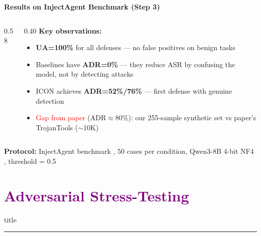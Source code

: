 \documentclass[aspectratio=169]{beamer}
\begin{document}
\begin{frame}{\textcolor{cmindsblue}{\textbf{Results on InjectAgent Benchmark (Step 3)}}}
  \vspace{-0.5cm}

  \begin{columns}[T]
    \begin{column}{0.58\textwidth}
      
    \end{column}

    \begin{column}{0.40\textwidth}
      \textcolor{cmindsblue}{\textbf{Key observations:}}\\[4pt]
      {\small
      \begin{itemize}
        \item \textbf{UA=100\%} for all defenses — no false positives on benign tasks
        \item Baselines have \textbf{ADR=0\%} — they reduce ASR by confusing the model, not by detecting attacks
        \item ICON achieves \textbf{ADR=52\%/76\%} — first defense with genuine detection
        \item \textcolor{red}{Gap from paper} (ADR$\approx$80\%): our 255-sample synthetic set vs paper's TrojanTools ($\sim$10K)
      \end{itemize}
      }
    \end{column}
  \end{columns}

  \vspace{2mm}
  {\scriptsize \textbf{Protocol:} InjectAgent benchmark \cite{zhan2024injectagent}, 50 cases per condition,
  Qwen3-8B 4-bit NF4 \cite{yang2025qwen3}, threshold = 0.5}
\end{frame}


\section{\textbf{\textcolor{purple}{Adversarial Stress-Testing}}}
\begin{frame}[plain]\vfill\centering
  \begin{beamercolorbox}[sep=8pt,center,shadow=true,rounded=true]{title}
    \insertsectionhead\par
    \color{oxfordblue}\noindent\rule{10cm}{1pt}
  \end{beamercolorbox}\vfill
\end{frame}
\end{document}
